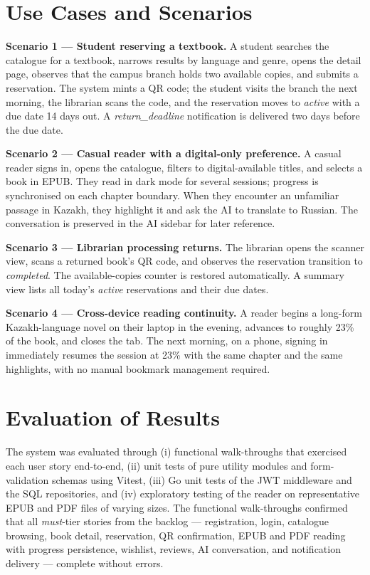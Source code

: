 \documentclass[12pt,a4paper]{report}
\begin{document}
\section{Use Cases and Scenarios}

\textbf{Scenario 1 --- Student reserving a textbook.} A student
searches the catalogue for a textbook, narrows results by language and
genre, opens the detail page, observes that the campus branch holds
two available copies, and submits a reservation. The system mints a QR
code; the student visits the branch the next morning, the librarian
scans the code, and the reservation moves to \textit{active} with a
due date 14 days out. A \textit{return\_deadline} notification is
delivered two days before the due date.

\textbf{Scenario 2 --- Casual reader with a digital-only preference.}
A casual reader signs in, opens the catalogue, filters to
digital-available titles, and selects a book in EPUB. They read in
dark mode for several sessions; progress is synchronised on each
chapter boundary. When they encounter an unfamiliar passage in
Kazakh, they highlight it and ask the AI to translate to Russian. The
conversation is preserved in the AI sidebar for later reference.

\textbf{Scenario 3 --- Librarian processing returns.} The librarian
opens the scanner view, scans a returned book's QR code, and observes
the reservation transition to \textit{completed}. The
available-copies counter is restored automatically. A summary view
lists all today's \textit{active} reservations and their due dates.

\textbf{Scenario 4 --- Cross-device reading continuity.} A reader
begins a long-form Kazakh-language novel on their laptop in the
evening, advances to roughly 23\% of the book, and closes the tab.
The next morning, on a phone, signing in immediately resumes the
session at 23\% with the same chapter and the same highlights, with
no manual bookmark management required.

\section{Evaluation of Results}

The system was evaluated through (i) functional walk-throughs that
exercised each user story end-to-end, (ii) unit tests of pure utility
modules and form-validation schemas using Vitest, (iii) Go unit tests
of the JWT middleware and the SQL repositories, and (iv) exploratory
testing of the reader on representative EPUB and PDF files of varying
sizes. The functional walk-throughs confirmed that all
\textit{must}-tier stories from the backlog --- registration, login,
catalogue browsing, book detail, reservation, QR confirmation, EPUB
and PDF reading with progress persistence, wishlist, reviews, AI
conversation, and notification delivery --- complete without errors.
\end{document}
